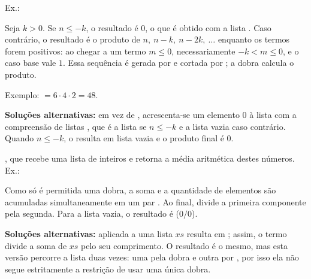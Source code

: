 {{\begin{Qlist}
        Ex.:

        \begin{solution}
        Seja $k>0$. Se $n\leq -k$, o resultado é $0$, o que é obtido com a lista
        . Caso contrário, o resultado é o produto de
        $n,\ n-k,\ n-2k,\ \ldots$ enquanto os termos forem positivos: ao chegar a um termo $m\leq 0$,
        necessariamente $-k<m\leq 0$, e o caso base vale $1$. Essa sequência é gerada por
         e cortada por ; a dobra
         calcula o produto.


        Exemplo:  $= 6\cdot 4\cdot 2 = 48$.


        \textbf{Soluções alternativas:} em vez de , acrescenta-se um elemento $0$ à lista com a compreensão de listas , que é a lista  se $n\leq -k$ e a lista vazia caso contrário. Quando $n\leq -k$, o  resulta em lista vazia e o produto final é $0$.

        \end{solution}

        \item[(c)] , que recebe uma lista de inteiros 
             e retorna a média aritmética destes números. Ex.:


        \begin{solution}
        Como só é permitida uma dobra, a soma e a quantidade de elementos são acumuladas
        simultaneamente em um par . Ao final,
         divide a primeira componente pela segunda. Para a lista vazia,
        o resultado é  ($0/0$).


        \textbf{Soluções alternativas:}  aplicada a uma lista $xs$ resulta em ; assim, o termo divide a soma de $xs$ pelo seu comprimento. O resultado é o mesmo, mas esta versão percorre a lista duas vezes: uma pela dobra e outra por , por isso ela não segue estritamente a restrição de usar uma única dobra.


\end{solution}
\end{Qlist}}}
